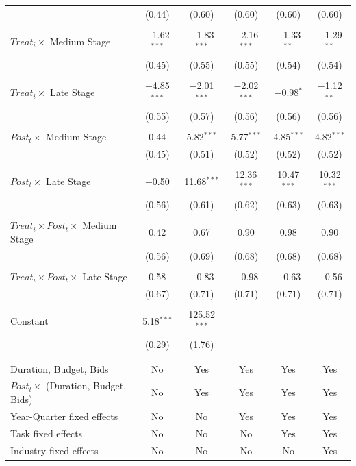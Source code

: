 \documentclass[
]{article}
\begin{document}
\begin{table}[H]
\begin{tabular}{@{\extracolsep{-2pt}}lccccc}
  & (0.44) & (0.60) & (0.60) & (0.60) & (0.60) \\ 
  & & & & & \\ 
 $Treat_i \times$ Medium Stage & $-$1.62$^{***}$ & $-$1.83$^{***}$ & $-$2.16$^{***}$ & $-$1.33$^{**}$ & $-$1.29$^{**}$ \\ 
  & (0.45) & (0.55) & (0.55) & (0.54) & (0.54) \\ 
  & & & & & \\ 
 $Treat_i \times$ Late Stage & $-$4.85$^{***}$ & $-$2.01$^{***}$ & $-$2.02$^{***}$ & $-$0.98$^{*}$ & $-$1.12$^{**}$ \\ 
  & (0.55) & (0.57) & (0.56) & (0.56) & (0.56) \\ 
  & & & & & \\ 
 $Post_t \times$ Medium Stage & 0.44 & 5.82$^{***}$ & 5.77$^{***}$ & 4.85$^{***}$ & 4.82$^{***}$ \\ 
  & (0.45) & (0.51) & (0.52) & (0.52) & (0.52) \\ 
  & & & & & \\ 
 $Post_t \times$ Late Stage & $-$0.50 & 11.68$^{***}$ & 12.36$^{***}$ & 10.47$^{***}$ & 10.32$^{***}$ \\ 
  & (0.56) & (0.61) & (0.62) & (0.63) & (0.63) \\ 
  & & & & & \\ 
 $Treat_i \times Post_t \times$ Medium Stage & 0.42 & 0.67 & 0.90 & 0.98 & 0.90 \\ 
  & (0.56) & (0.69) & (0.68) & (0.68) & (0.68) \\ 
  & & & & & \\ 
 $Treat_i \times Post_t \times$ Late Stage & 0.58 & $-$0.83 & $-$0.98 & $-$0.63 & $-$0.56 \\ 
  & (0.67) & (0.71) & (0.71) & (0.71) & (0.71) \\ 
  & & & & & \\ 
 Constant & 5.18$^{***}$ & 125.52$^{***}$ &  &  &  \\ 
  & (0.29) & (1.76) &  &  &  \\ 
  & & & & & \\ 
\hline \\[-1.8ex] 
Duration, Budget, Bids & No & Yes & Yes & Yes & Yes \\ 
$Post_t \times $  (Duration, Budget, Bids) & No & Yes & Yes & Yes & Yes \\ 
Year-Quarter fixed effects & No & No & Yes & Yes & Yes \\ 
Task fixed effects & No & No & No & Yes & Yes \\ 
Industry fixed effects & No & No & No & No & Yes \\ 

\end{tabular}
\end{table}
\end{document}
